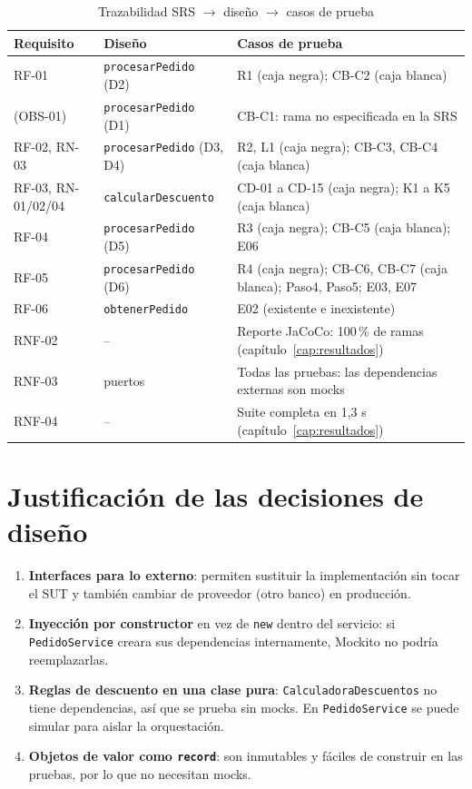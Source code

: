 \documentclass[11pt,a4paper,oneside]{report}
\newcommand{\code}[1]{\texttt{#1}}
\begin{document}
\begin{table}[H]
\centering
\caption{Trazabilidad SRS $\rightarrow$ diseño $\rightarrow$ casos de prueba}
\small
\begin{tabularx}{\linewidth}{llX}
\toprule
\textbf{Requisito} & \textbf{Diseño} & \textbf{Casos de prueba}\\
\midrule
RF-01 & \code{procesarPedido} (D2) & R1 (caja negra); CB-C2 (caja blanca)\\
(OBS-01) & \code{procesarPedido} (D1) & CB-C1: rama no especificada en la SRS\\
RF-02, RN-03 & \code{procesarPedido} (D3, D4) & R2, L1 (caja negra); CB-C3, CB-C4 (caja blanca)\\
RF-03, RN-01/02/04 & \code{calcularDescuento} & CD-01 a CD-15 (caja negra); K1 a K5 (caja blanca)\\
RF-04 & \code{procesarPedido} (D5) & R3 (caja negra); CB-C5 (caja blanca); E06\\
RF-05 & \code{procesarPedido} (D6) & R4 (caja negra); CB-C6, CB-C7 (caja blanca); Paso4, Paso5; E03, E07\\
RF-06 & \code{obtenerPedido} & E02 (existente e inexistente)\\
RNF-02 & -- & Reporte JaCoCo: 100\,\% de ramas (capítulo~\ref{cap:resultados})\\
RNF-03 & puertos & Todas las pruebas: las dependencias externas son mocks\\
RNF-04 & -- & Suite completa en 1,3 s (capítulo~\ref{cap:resultados})\\
\bottomrule
\end{tabularx}
\end{table}

\section{Justificación de las decisiones de diseño}
\begin{enumerate}
  \item \textbf{Interfaces para lo externo}: permiten sustituir la implementación sin tocar el SUT y también cambiar de proveedor (otro banco) en producción.
  \item \textbf{Inyección por constructor} en vez de \code{new} dentro del servicio: si \code{PedidoService} creara sus dependencias internamente, Mockito no podría reemplazarlas.
  \item \textbf{Reglas de descuento en una clase pura}: \code{CalculadoraDescuentos} no tiene dependencias, así que se prueba sin mocks. En \code{PedidoService} se puede simular para aislar la orquestación.
  \item \textbf{Objetos de valor como \code{record}}: son inmutables y fáciles de construir en las pruebas, por lo que no necesitan mocks.
\end{enumerate}
\end{document}
